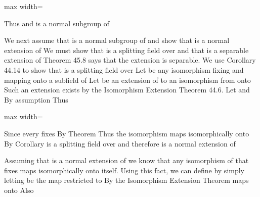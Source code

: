 \documentclass[11pt,oneside]{article}
\begin{document}
\begin{BookBody}
\begin{center}\begin{adjustbox}{max width=\linewidth}\end{adjustbox}\end{center}

\noindent Thus and  is a normal subgroup of 

We next assume that  is a normal subgroup of  and show that  is a normal extension of  We must show that  is a splitting field over  and that  is a separable extension of  Theorem 45.8 says that the extension is separable. We use Corollary 44.14 to show that  is a splitting field over  Let  be any isomorphism fixing  and mapping  onto a subfield of  Let \BookInline{\sigma } be an extension of  to an isomorphism from  onto  Such an extension exists by the Isomorphism Extension Theorem 44.6. Let  and  By assumption  Thus

\begin{center}\begin{adjustbox}{max width=\linewidth}\end{adjustbox}\end{center}

\noindent Since every  fixes  By Theorem  Thus the isomorphism  maps  isomorphically onto  By Corollary  is a splitting field over  and therefore is a normal extension of 

Assuming that  is a normal extension of  we know that any isomorphism of  that fixes  maps  isomorphically onto itself. Using this fact, we can define  by simply letting \BookInline{\phi (\sigma )} be the map \BookInline{\sigma } restricted to  By the Isomorphism Extension Theorem  maps onto  Also


\end{BookBody}
\end{document}
